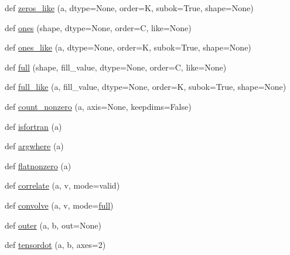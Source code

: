 \begin{DoxyCompactItemize}
\item 
def \hyperlink{namespacenumpy_1_1core_1_1numeric_aff34b60351859b2e2797e226ad04ddd0}{zeros\+\_\+like} (a, dtype=None, order=\textquotesingle{}K\textquotesingle{}, subok=True, shape=None)
\item 
def \hyperlink{namespacenumpy_1_1core_1_1numeric_a6bdbcb3ea5a55908e290dee2c72c0079}{ones} (shape, dtype=None, order=\textquotesingle{}C\textquotesingle{}, like=None)
\item 
def \hyperlink{namespacenumpy_1_1core_1_1numeric_a788d1bc80059cdd4214e4f76fd142cc0}{ones\+\_\+like} (a, dtype=None, order=\textquotesingle{}K\textquotesingle{}, subok=True, shape=None)
\item 
def \hyperlink{namespacenumpy_1_1core_1_1numeric_aa5dcece77169e453f2094ad8a884ced8}{full} (shape, fill\+\_\+value, dtype=None, order=\textquotesingle{}C\textquotesingle{}, like=None)
\item 
def \hyperlink{namespacenumpy_1_1core_1_1numeric_ab36c0d44478fd8d1cd569ab44cba5b4b}{full\+\_\+like} (a, fill\+\_\+value, dtype=None, order=\textquotesingle{}K\textquotesingle{}, subok=True, shape=None)
\item 
def \hyperlink{namespacenumpy_1_1core_1_1numeric_a2c64f4a657e9277ac9196f1e5c9c8ce3}{count\+\_\+nonzero} (a, axis=None, keepdims=False)
\item 
def \hyperlink{namespacenumpy_1_1core_1_1numeric_aca2519ee360f263c4f3410065dd08692}{isfortran} (a)
\item 
def \hyperlink{namespacenumpy_1_1core_1_1numeric_a1b1ea621ebdf27d454d7d9887c68f67a}{argwhere} (a)
\item 
def \hyperlink{namespacenumpy_1_1core_1_1numeric_ac8b23f45060462d59df4609deb36da30}{flatnonzero} (a)
\item 
def \hyperlink{namespacenumpy_1_1core_1_1numeric_aadcf1c35df9b086c7f3dec19cc6c9579}{correlate} (a, v, mode=\textquotesingle{}valid\textquotesingle{})
\item 
def \hyperlink{namespacenumpy_1_1core_1_1numeric_af1d206f80ecc160a47c672986d063595}{convolve} (a, v, mode=\textquotesingle{}\hyperlink{namespacenumpy_1_1core_1_1numeric_aa5dcece77169e453f2094ad8a884ced8}{full}\textquotesingle{})
\item 
def \hyperlink{namespacenumpy_1_1core_1_1numeric_acb46476790d894e402755264dfc69ffb}{outer} (a, b, out=None)
\item 
def \hyperlink{namespacenumpy_1_1core_1_1numeric_ad0f92680111292b4be69b722b3732991}{tensordot} (a, b, axes=2)

\end{DoxyCompactItemize}
